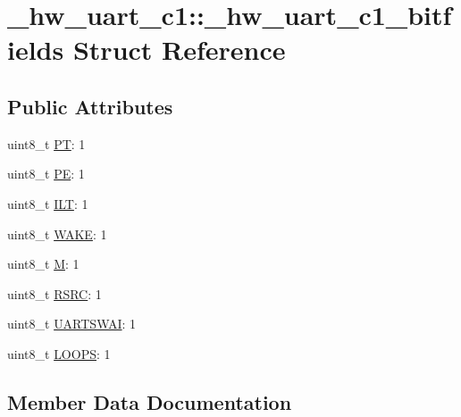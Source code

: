\hypertarget{struct__hw__uart__c1_1_1__hw__uart__c1__bitfields}{}\section{\+\_\+hw\+\_\+uart\+\_\+c1\+:\+:\+\_\+hw\+\_\+uart\+\_\+c1\+\_\+bitfields Struct Reference}
\label{struct__hw__uart__c1_1_1__hw__uart__c1__bitfields}
\subsection*{Public Attributes}
\begin{DoxyCompactItemize}
\item 
uint8\+\_\+t \hyperlink{struct__hw__uart__c1_1_1__hw__uart__c1__bitfields_afa3a565a4c213bc754d0d3f2512f58fd}{PT}\+: 1
\item 
uint8\+\_\+t \hyperlink{struct__hw__uart__c1_1_1__hw__uart__c1__bitfields_a479adfb85f5aa1985a58db1dd4674fee}{PE}\+: 1
\item 
uint8\+\_\+t \hyperlink{struct__hw__uart__c1_1_1__hw__uart__c1__bitfields_a2d18feb232d27769da331d054958c8e0}{I\+LT}\+: 1
\item 
uint8\+\_\+t \hyperlink{struct__hw__uart__c1_1_1__hw__uart__c1__bitfields_a18d45042ee4607b104437a52e489dada}{W\+A\+KE}\+: 1
\item 
uint8\+\_\+t \hyperlink{struct__hw__uart__c1_1_1__hw__uart__c1__bitfields_ad6465209aae3705ebbf7586f1781478e}{M}\+: 1
\item 
uint8\+\_\+t \hyperlink{struct__hw__uart__c1_1_1__hw__uart__c1__bitfields_a0b0e6a007499ce378208760e62e3f21d}{R\+S\+RC}\+: 1
\item 
uint8\+\_\+t \hyperlink{struct__hw__uart__c1_1_1__hw__uart__c1__bitfields_a21eb69d7bb4874279ec01efb822b5a53}{U\+A\+R\+T\+S\+W\+AI}\+: 1
\item 
uint8\+\_\+t \hyperlink{struct__hw__uart__c1_1_1__hw__uart__c1__bitfields_abd3c01ce0c4deb75412225f63a29565f}{L\+O\+O\+PS}\+: 1
\end{DoxyCompactItemize}


\subsection{Member Data Documentation}
